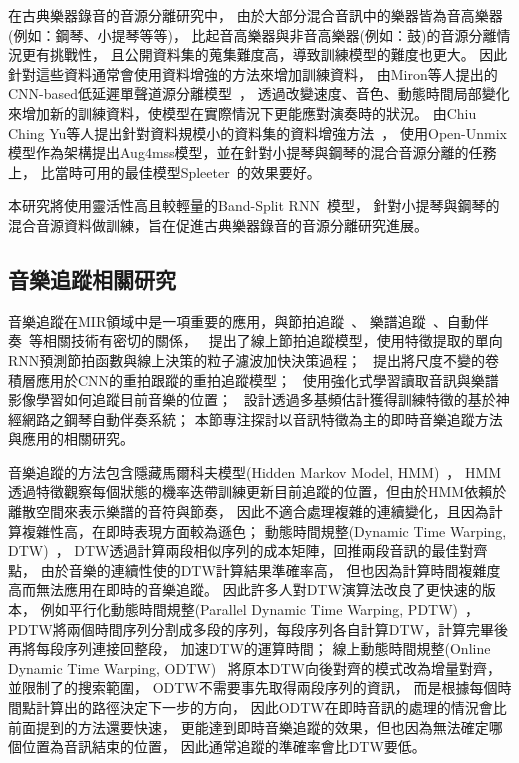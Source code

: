 \documentclass[class=NCU_thesis, crop=false]{standalone}
\begin{document}
在古典樂器錄音的音源分離研究中，
由於大部分混合音訊中的樂器皆為音高樂器(例如：鋼琴、小提琴等等)，
比起音高樂器與非音高樂器(例如：鼓)的音源分離情況更有挑戰性，
且公開資料集的蒐集難度高，導致訓練模型的難度也更大。
因此針對這些資料通常會使用資料增強的方法來增加訓練資料，
由Miron等人提出的CNN-based低延遲單聲道源分離模型~\cite{miron2017generating}，
透過改變速度、音色、動態時間局部變化來增加新的訓練資料，使模型在實際情況下更能應對演奏時的狀況。
由Chiu Ching Yu等人提出針對資料規模小的資料集的資料增強方法~\cite{Chiu_ChingYu2020MixingSpecific}，
使用Open-Unmix模型作為架構提出Aug4mss模型，並在針對小提琴與鋼琴的混合音源分離的任務上，
比當時可用的最佳模型Spleeter~\cite{hennequin2020spleeter}的效果要好。

本研究將使用靈活性高且較輕量的Band-Split RNN~\cite{Luo_Yi2022MusicSourceSeparation}模型，
針對小提琴與鋼琴的混合音源資料做訓練，旨在促進古典樂器錄音的音源分離研究進展。


\subsection{音樂追蹤相關研究}
音樂追蹤在MIR領域中是一項重要的應用，與節拍追蹤~\cite{heydari2021don, di2021downbeat}、
樂譜追蹤~\cite{henkel2019score}、自動伴奏~\cite{zhang2023design}等相關技術有密切的關係，
~\cite{heydari2021don}提出了線上節拍追蹤模型，使用特徵提取的單向RNN預測節拍函數與線上決策的粒子濾波加快決策過程；
~\cite{di2021downbeat}提出將尺度不變的卷積層應用於CNN的重拍跟蹤的重拍追蹤模型；
~\cite{henkel2019score}使用強化式學習讀取音訊與樂譜影像學習如何追蹤目前音樂的位置；
~\cite{zhang2023design}設計透過多基頻估計獲得訓練特徵的基於神經網路之鋼琴自動伴奏系統；
本節專注探討以音訊特徵為主的即時音樂追蹤方法與應用的相關研究。

音樂追蹤的方法包含隱藏馬爾科夫模型(Hidden Markov Model, HMM)~\cite{cano1999score}，
HMM透過特徵觀察每個狀態的機率迭帶訓練更新目前追蹤的位置，但由於HMM依賴於離散空間來表示樂譜的音符與節奏，
因此不適合處理複雜的連續變化，且因為計算複雜性高，在即時表現方面較為遜色；
動態時間規整(Dynamic Time Warping, DTW)~\cite{Sakoe1978Dynamic, Arzt2012Adaptive}，
DTW透過計算兩段相似序列的成本矩陣，回推兩段音訊的最佳對齊點，
由於音樂的連續性使的DTW計算結果準確率高，
但也因為計算時間複雜度高而無法應用在即時的音樂追蹤。
因此許多人對DTW演算法改良了更快速的版本，
例如平行化動態時間規整(Parallel Dynamic Time Warping, PDTW)~\cite{takahashi2009parallelized, Wei2018Online}，
PDTW將兩個時間序列分割成多段的序列，每段序列各自計算DTW，計算完畢後再將每段序列連接回整段，
加速DTW的運算時間；
線上動態時間規整(Online Dynamic Time Warping, ODTW)~\cite{dixon2005ODTW, Arzt2010Towards, Lin2020AHumanComputerDuetSystem}
將原本DTW向後對齊的模式改為增量對齊，並限制了的搜索範圍，
ODTW不需要事先取得兩段序列的資訊，
而是根據每個時間點計算出的路徑決定下一步的方向，
因此ODTW在即時音訊的處理的情況會比前面提到的方法還要快速，
更能達到即時音樂追蹤的效果，但也因為無法確定哪個位置為音訊結束的位置，
因此通常追蹤的準確率會比DTW要低。
\end{document}
